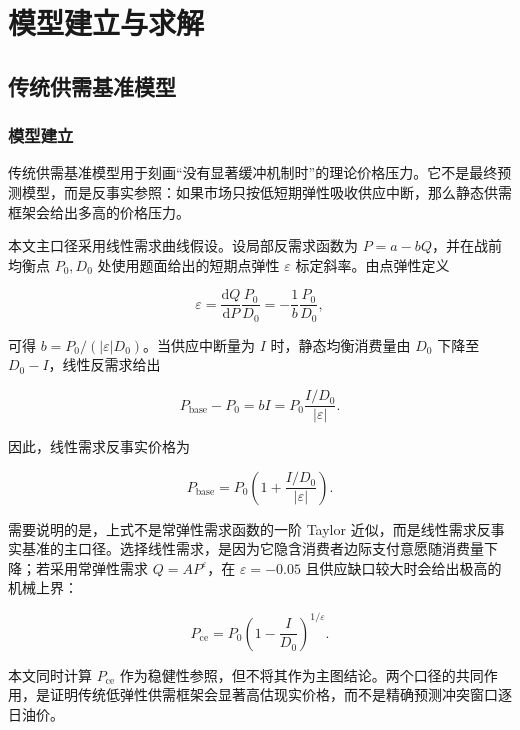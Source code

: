 \section{模型建立与求解}

\subsection{传统供需基准模型}

\subsubsection{模型建立}

传统供需基准模型用于刻画“没有显著缓冲机制时”的理论价格压力。它不是最终预测模型，而是反事实参照：如果市场只按低短期弹性吸收供应中断，那么静态供需框架会给出多高的价格压力。

本文主口径采用线性需求曲线假设。设局部反需求函数为 \(P=a-bQ\)，并在战前均衡点 \(P_0,D_0\) 处使用题面给出的短期点弹性 \(\varepsilon\) 标定斜率。由点弹性定义

\begin{equation}
  \varepsilon
  =
  \frac{\mathrm d Q}{\mathrm d P}\frac{P_0}{D_0}
  =
  -\frac{1}{b}\frac{P_0}{D_0},
\end{equation}

可得 \(b=P_0/(|\varepsilon|D_0)\)。当供应中断量为 \(I\) 时，静态均衡消费量由 \(D_0\) 下降至 \(D_0-I\)，线性反需求给出

\begin{equation}
  P_{\mathrm{base}}-P_0
  =
  bI
  =
  P_0\frac{I/D_0}{|\varepsilon|}.
\end{equation}

因此，线性需求反事实价格为

\begin{equation}
  P_{\mathrm{base}}
  =
  P_0
  \left(
    1+\frac{I/D_0}{|\varepsilon|}
  \right).
\end{equation}

需要说明的是，上式不是常弹性需求函数的一阶 Taylor 近似，而是线性需求反事实基准的主口径。选择线性需求，是因为它隐含消费者边际支付意愿随消费量下降；若采用常弹性需求 \(Q=A P^\varepsilon\)，在 \(\varepsilon=-0.05\) 且供应缺口较大时会给出极高的机械上界：

\begin{equation}
  P_{\mathrm{ce}}
  =
  P_0
  \left(
    1-\frac{I}{D_0}
  \right)^{1/\varepsilon}.
\end{equation}

本文同时计算 \(P_{\mathrm{ce}}\) 作为稳健性参照，但不将其作为主图结论。两个口径的共同作用，是证明传统低弹性供需框架会显著高估现实价格，而不是精确预测冲突窗口逐日油价。


